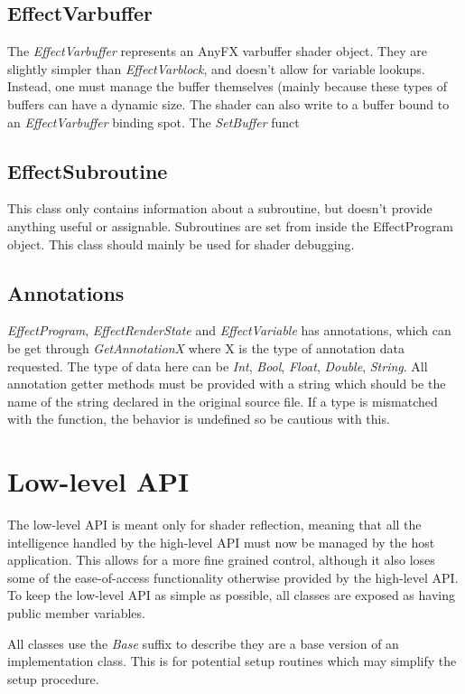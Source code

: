\documentclass{article}
\begin{document}
\subsection{EffectVarbuffer}
The \textit{EffectVarbuffer} represents an AnyFX varbuffer shader object. They are slightly simpler than \textit{EffectVarblock}, and doesn't allow for variable lookups. Instead, one must manage the buffer themselves (mainly because these types of buffers can have a dynamic size. The shader can also write to a buffer bound to an \textit{EffectVarbuffer} binding spot. The \textit{SetBuffer} funct

\subsection{EffectSubroutine}
This class only contains information about a subroutine, but doesn't provide anything useful or assignable. Subroutines are set from inside the EffectProgram object. This class should mainly be used for shader debugging.

\subsection{Annotations}
\textit{EffectProgram}, \textit{EffectRenderState} and \textit{EffectVariable} has annotations, which can be get through \textit{GetAnnotationX} where X is the type of annotation data requested. The type of data here can be \textit{Int}, \textit{Bool}, \textit{Float}, \textit{Double}, \textit{String}. All annotation getter methods must be provided with a string which should be the name of the string declared in the original source file. If a type is mismatched with the function, the behavior is undefined so be cautious with this. 

\section{Low-level API}
The low-level API is meant only for shader reflection, meaning that all the intelligence handled by the high-level API must now be managed by the host application. This allows for a more fine grained control, although it also loses some of the ease-of-access functionality otherwise provided by the high-level API. To keep the low-level API as simple as possible, all classes are exposed as having public member variables.

All classes use the \textit{Base} suffix to describe they are a base version of an implementation class. This is for potential setup routines which may simplify the setup procedure.
\end{document}
